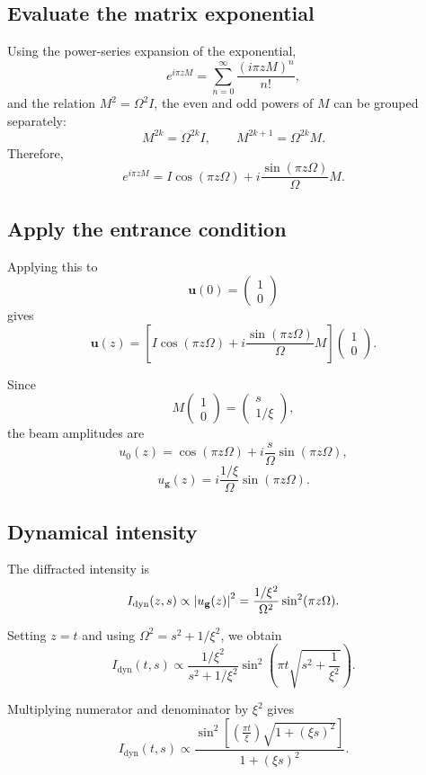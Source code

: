 \documentclass[11pt]{article}
\begin{document}
\subsection{Evaluate the matrix exponential}

Using the power-series expansion of the exponential,
\[
e^{i\pi zM}=\sum_{n=0}^{\infty}\frac{(i\pi zM)^n}{n!},
\]
and the relation \(M^2=\Omega^2 I\), the even and odd powers of \(M\) can be grouped separately:
\[
M^{2k}=\Omega^{2k}I,
\qquad
M^{2k+1}=\Omega^{2k}M.
\]
Therefore,
\[
e^{i\pi zM}
=
I\cos(\pi z\Omega)
+
i\frac{\sin(\pi z\Omega)}{\Omega}M.
\]

\subsection{Apply the entrance condition}

Applying this to
\[
\mathbf{u}(0)=
\begin{pmatrix}
1\\
0
\end{pmatrix}
\]
gives
\[
\mathbf{u}(z)
=
\left[
I\cos(\pi z\Omega)
+
i\frac{\sin(\pi z\Omega)}{\Omega}M
\right]
\begin{pmatrix}
1\\
0
\end{pmatrix}.
\]

Since
\[
M
\begin{pmatrix}
1\\
0
\end{pmatrix}
=
\begin{pmatrix}
s\\
1/\xi
\end{pmatrix},
\]
the beam amplitudes are
\[
u_0(z)=\cos(\pi z\Omega)+i\frac{s}{\Omega}\sin(\pi z\Omega),
\]
\[
u_{\mathbf g}(z)=i\frac{1/\xi}{\Omega}\sin(\pi z\Omega).
\]

\subsection{Dynamical intensity}

The diffracted intensity is
\[
I_{\mathrm{dyn}}(z,s)\propto \abs{u_{\mathbf g}(z)}^2
=
\frac{1/\xi^2}{\Omega^2}\sin^2(\pi z\Omega).
\]

Setting \(z=t\) and using \(\Omega^2=s^2+1/\xi^2\), we obtain
\[
I_{\mathrm{dyn}}(t,s)
\propto
\frac{1/\xi^2}{s^2+1/\xi^2}
\sin^2\!\left(\pi t\sqrt{s^2+\frac{1}{\xi^2}}\right).
\]

Multiplying numerator and denominator by \(\xi^2\) gives
\[
I_{\mathrm{dyn}}(t,s)
\propto
\frac{
\sin^2\!\left[
\left(\frac{\pi t}{\xi}\right)\sqrt{1+(\xi s)^2}
\right]
}{
1+(\xi s)^2
}.
\]
\end{document}
